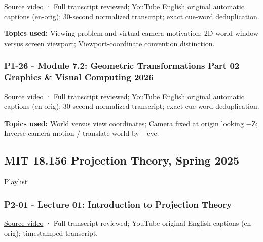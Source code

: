 \href{https://www.youtube.com/watch?v=oeEe2WiSku8}{Source video} · Full transcript reviewed; YouTube English original automatic captions (en-orig); 30-second normalized transcript; exact cue-word deduplication.

\textbf{Topics used:} Viewing problem and virtual camera motivation; 2D world window versus screen viewport; Viewport-coordinate convention distinction.

\subsubsection{P1-26 - Module 7.2: Geometric Transformations Part 02 Graphics \& Visual Computing 2026}\label{04-visual-computing-ii-ch036-p1-26---module-7.2-geometric-transformations-part-02-graphics-visual-computing-2026}

\hypertarget{04-visual-computing-ii-ch036-p1-26---module-7.2-geometric-transformations-part-02-graphics-visual-computing-2026}{}

\href{https://www.youtube.com/watch?v=GnIE0V5dS1w}{Source video} · Full transcript reviewed; YouTube English original automatic captions (en-orig); 30-second normalized transcript; exact cue-word deduplication.

\textbf{Topics used:} World versus view coordinates; Camera fixed at origin looking −Z; Inverse camera motion / translate world by −eye.

\subsection{MIT 18.156 Projection Theory, Spring 2025}\label{04-visual-computing-ii-ch036-mit-18.156-projection-theory-spring-2025}

\hypertarget{04-visual-computing-ii-ch036-mit-18.156-projection-theory-spring-2025}{}

\href{https://www.youtube.com/playlist?list=PLUl4u3cNGP62K9_7Pg26ytrAOXwXFpN43}{Playlist}

\subsubsection{P2-01 - Lecture 01: Introduction to Projection Theory}\label{04-visual-computing-ii-ch036-p2-01---lecture-01-introduction-to-projection-theory}

\hypertarget{04-visual-computing-ii-ch036-p2-01---lecture-01-introduction-to-projection-theory}{}

\href{https://www.youtube.com/watch?v=1A1kWkxK3QY}{Source video} · Full transcript reviewed; YouTube original English captions (en-orig); timestamped transcript.

